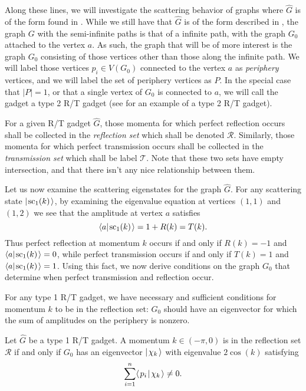 \documentclass[../thesis-main/thesis-main]{subfiles}
\begin{document}
Along these lines, we will investigate the scattering behavior of graphs where $\widehat{G}$ is of the form found in .  While we still have that $\widehat{G}$ is of the form described in , the graph $G$ with the semi-infinite paths is that of a infinite path, with the graph $G_0$ attached to the vertex $a$.  As such, the graph that will be of more interest is the graph $G_0$ consisting of those vertices other than those along the infinite path.   We will label those vertices $p_i\in V(G_0)$ connected to the vertex $a$ as \emph{periphery} vertices, and we will label the set of periphery vertices as $P$.  In the special case that $|P| = 1$, or that a single vertex of $G_0$ is connected to $a$, we will call the gadget a type 2 R/T gadget (see  for an example of a type 2 R/T gadget).

For a given R/T gadget $\widehat{G}$, those momenta for which perfect reflection occurs shall be collected in the \emph{reflection set} which shall be denoted $\mathcal{R}$.  Similarly, those momenta for which perfect transmission occurs shall be collected in the \emph{transmission set} which shall be label $\mathcal{T}$. Note that these two sets have empty intersection, and that there isn't any nice relationship between them.

Let us now examine the scattering eigenstates for the graph $\widehat{G}$.  For any scattering state $|\mspace{2mu} \text{sc}_{1} (k) \mspace{2mu} \rangle$, by examining the eigenvalue equation at vertices $(1,1)$ and $(1,2)$ we see that the amplitude at vertex $a$ satisfies
\begin{equation}
  \langle{a}|\mspace{2mu} \text{sc}_{1} (k) \mspace{2mu} \rangle = 1 + R(k) = T(k).
\end{equation}
Thus perfect reflection at momentum $k$ occurs if and only if $R(k)=-1$ and $\langle{a}|\mspace{2mu} \text{sc}_{1} (k) \mspace{2mu} \rangle=0$, while perfect transmission occurs if and only if $T(k)=1$ and $\langle{a}|\mspace{2mu} \text{sc}_{1} (k) \mspace{2mu} \rangle=1$. Using this fact, we now derive conditions on the graph $G_0$ that determine when perfect transmission and reflection occur.

For any type 1 R/T gadget, we have necessary and sufficient conditions for momentum $k$ to be in the reflection set: $G_0$ should have an eigenvector for which the sum of amplitudes on the periphery is nonzero.
\begin{lemma}
Let $\widehat{G}$ be a type 1 R/T gadget. A momentum $k\in (-\pi,0)$ is in the reflection set $\mathcal{R}$ if and only if $G_0$ has an eigenvector $|\mspace{2mu} \chi_k \mspace{2mu} \rangle$ with eigenvalue $2\cos(k)$ satisfying
\begin{equation}
  \sum_{i=1}^{n} \langle\mspace{2mu} p_i \mspace{2mu} | \mspace{2mu} \chi_k\mspace{2mu} \rangle \neq 0. \label{eq:sum_condition}
\end{equation}
\label{lem:reflect_reqs}
\end{lemma}
\end{document}

